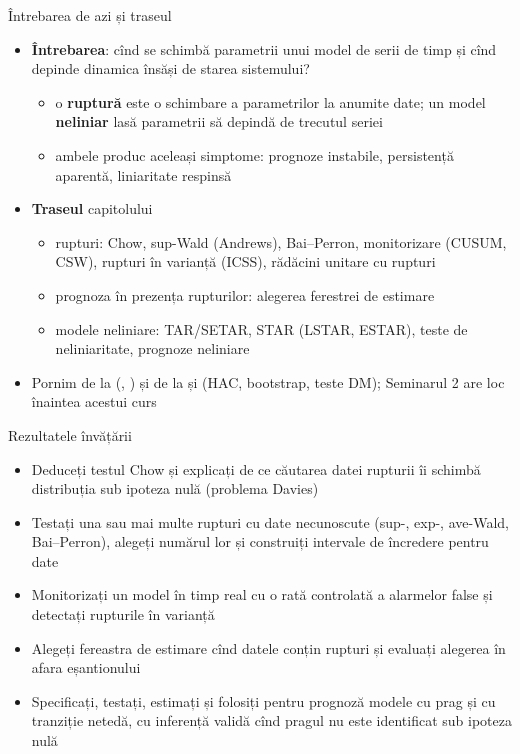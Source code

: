 \begin{frame}{Întrebarea de azi și traseul}
\itemsize{\small}
\begin{itemize}
    \item \textbf{Întrebarea}: cînd se schimbă parametrii unui model de serii de timp și cînd depinde dinamica însăși de starea sistemului?
    \begin{itemize}
        \item o \textbf{ruptură} este o schimbare a parametrilor la anumite date; un model \textbf{neliniar} lasă parametrii să depindă de trecutul seriei
        \item ambele produc aceleași simptome: prognoze instabile, persistență aparentă, liniaritate respinsă
    \end{itemize}
    \item \textbf{Traseul} capitolului
    \begin{itemize}
        \item rupturi: Chow, sup-Wald (Andrews), Bai--Perron, monitorizare (CUSUM, CSW), rupturi în varianță (ICSS), rădăcini unitare cu rupturi
        \item prognoza în prezența rupturilor: alegerea ferestrei de estimare
        \item modele neliniare: TAR/SETAR, STAR (LSTAR, ESTAR), teste de neliniaritate, prognoze neliniare
    \end{itemize}
    \item Pornim de la  (, ) și de la  și  (HAC, bootstrap, teste DM); Seminarul 2 are loc înaintea acestui curs
\end{itemize}
\end{frame}

\begin{frame}{Rezultatele învățării}
\itemsize{\small}
\begin{itemize}
    \item Deduceți testul Chow și explicați de ce căutarea datei rupturii îi schimbă distribuția sub ipoteza nulă (problema Davies)
    \item Testați una sau mai multe rupturi cu date necunoscute (sup-, exp-, ave-Wald, Bai--Perron), alegeți numărul lor și construiți intervale de încredere pentru date
    \item Monitorizați un model în timp real cu o rată controlată a alarmelor false și detectați rupturile în varianță
    \item Alegeți fereastra de estimare cînd datele conțin rupturi și evaluați alegerea în afara eșantionului
    \item Specificați, testați, estimați și folosiți pentru prognoză modele cu prag și cu tranziție netedă, cu inferență validă cînd pragul nu este identificat sub ipoteza nulă
\end{itemize}
\end{frame}

